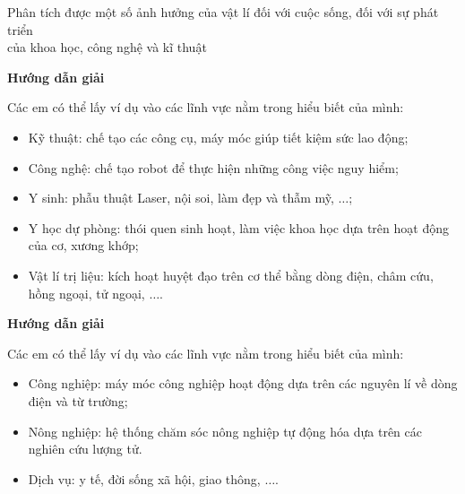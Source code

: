 \begin{dang}{Phân tích được một số ảnh hưởng của vật lí đối với cuộc sống, đối với sự phát triển \\của khoa học, công nghệ và kĩ thuật}
	{	\begin{center}
			\textbf{Hướng dẫn giải}
		\end{center}
		
		Các em có thể lấy ví dụ vào các lĩnh vực nằm trong hiểu biết của mình:
		\begin{itemize}
			\item Kỹ thuật: chế tạo các công cụ, máy móc giúp tiết kiệm sức lao động;
			\item Công nghệ: chế tạo robot để thực hiện những công việc nguy hiểm;
			\item Y sinh: phẫu thuật Laser, nội soi, làm đẹp và thẫm mỹ, $\ldots$; 
			\item Y học dự phòng: thói quen sinh hoạt, làm việc khoa học dựa trên hoạt động của cơ, xương khớp;
			\item Vật lí trị liệu: kích hoạt huyệt đạo trên cơ thể bằng dòng điện, châm cứu, hồng ngoại, tử ngoại, $\ldots$.
		\end{itemize}
	}
	{\begin{center}
			\textbf{Hướng dẫn giải}
		\end{center}
		
		Các em có thể lấy ví dụ vào các lĩnh vực nằm trong hiểu biết của mình:
		\begin{itemize}
			\item Công nghiệp: máy móc công nghiệp hoạt động dựa trên các nguyên lí về dòng điện và từ trường;
			\item Nông nghiệp: hệ thống chăm sóc nông nghiệp tự động hóa dựa trên các nghiên cứu lượng tử.
			\item Dịch vụ: y tế, đời sống xã hội, giao thông, $\ldots$.
		\end{itemize}
	}
\end{dang}

